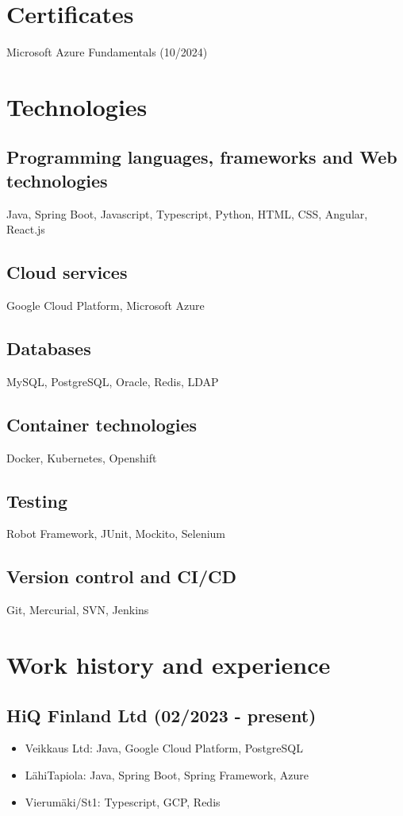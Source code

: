 \documentclass[a4paper,12pt]{article}
\begin{document}
\section*{Certificates}
Microsoft Azure Fundamentals (10/2024)
\section*{Technologies}
\subsection*{Programming languages, frameworks and Web technologies}
Java, Spring Boot, Javascript, Typescript, Python, HTML, CSS, Angular, React.js
\subsection*{Cloud services}
Google Cloud Platform, Microsoft Azure
\subsection*{Databases}
MySQL, PostgreSQL, Oracle, Redis, LDAP
\subsection*{Container technologies}
Docker, Kubernetes, Openshift
\subsection*{Testing}
Robot Framework, JUnit, Mockito, Selenium
\subsection*{Version control and CI/CD}
Git, Mercurial, SVN, Jenkins
\section*{Work history and experience}
\subsection*{HiQ Finland Ltd (02/2023 - present)}
\begin{itemize}
\item{Veikkaus Ltd: Java, Google Cloud Platform, PostgreSQL}
\item{LähiTapiola: Java, Spring Boot, Spring Framework, Azure}
\item{Vierumäki/St1: Typescript, GCP, Redis}
\end{itemize}
\end{document}
